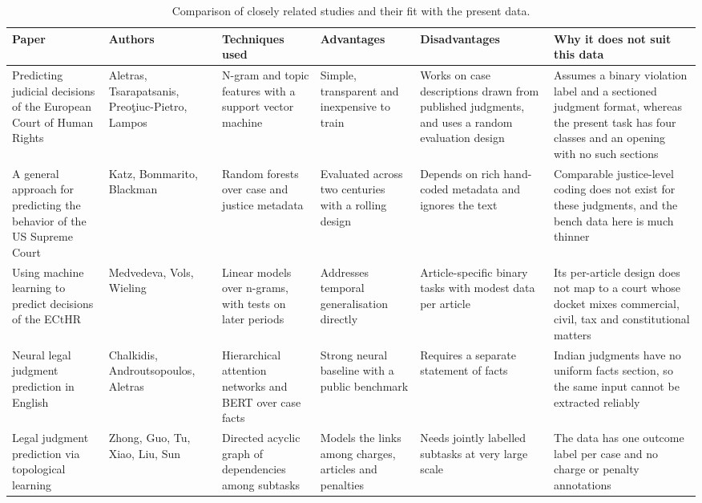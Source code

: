\documentclass[journal]{IEEEtran}
\begin{document}
\begin{table}[!t]
\caption{Comparison of closely related studies and their fit with the present data.}\label{tab:compare}
\scriptsize\setlength{\tabcolsep}{3pt}\renewcommand{\arraystretch}{1.1}
\centering
\begin{tabular}{@{}Y{0.145\textwidth}Y{0.095\textwidth}Y{0.165\textwidth}Y{0.155\textwidth}Y{0.155\textwidth}Y{0.21\textwidth}@{}}
\toprule
\textbf{Paper} & \textbf{Authors} & \textbf{Techniques used} & \textbf{Advantages} & \textbf{Disadvantages} & \textbf{Why it does not suit this data}\\\midrule
Predicting judicial decisions of the European Court of Human Rights \cite{r1} & Aletras, Tsarapatsanis, Preo\c{t}iuc-Pietro, Lampos & N-gram and topic features with a support vector machine & Simple, transparent and inexpensive to train & Works on case descriptions drawn from published judgments, and uses a random evaluation design & Assumes a binary violation label and a sectioned judgment format, whereas the present task has four classes and an opening with no such sections\\
A general approach for predicting the behavior of the US Supreme Court \cite{r4} & Katz, Bommarito, Blackman & Random forests over case and justice metadata & Evaluated across two centuries with a rolling design & Depends on rich hand-coded metadata and ignores the text & Comparable justice-level coding does not exist for these judgments, and the bench data here is much thinner\\
Using machine learning to predict decisions of the ECtHR \cite{r2} & Medvedeva, Vols, Wieling & Linear models over n-grams, with tests on later periods & Addresses temporal generalisation directly & Article-specific binary tasks with modest data per article & Its per-article design does not map to a court whose docket mixes commercial, civil, tax and constitutional matters\\
Neural legal judgment prediction in English \cite{r3} & Chalkidis, Androutsopoulos, Aletras & Hierarchical attention networks and BERT over case facts & Strong neural baseline with a public benchmark & Requires a separate statement of facts & Indian judgments have no uniform facts section, so the same input cannot be extracted reliably\\
Legal judgment prediction via topological learning \cite{r5} & Zhong, Guo, Tu, Xiao, Liu, Sun & Directed acyclic graph of dependencies among subtasks & Models the links among charges, articles and penalties & Needs jointly labelled subtasks at very large scale & The data has one outcome label per case and no charge or penalty annotations\\

\end{tabular}
\end{table}
\end{document}
